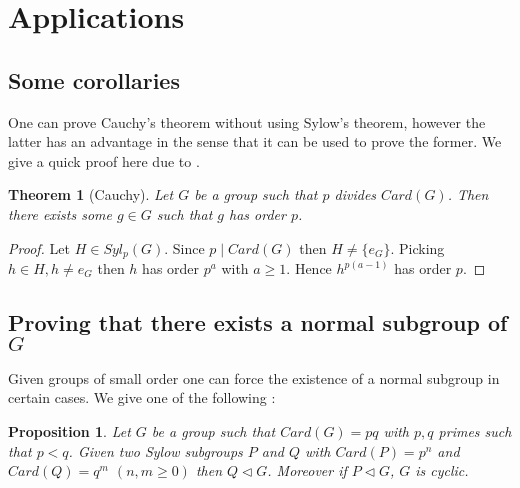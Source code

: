 \documentclass{article}
\theoremstyle{definition}
\theoremstyle{plain}
\newtheorem{proposition}[subsubsection]{Proposition}
\theoremstyle{plain}
\theoremstyle{plain}
\theoremstyle{plain}
\theoremstyle{definition}
\theoremstyle{plain}
\newtheorem{thmeng}[subsubsection]{Theorem}
\theoremstyle{plain}
\begin{document}
\clearpage
{}
\section{Applications}

\subsection{Some corollaries}

One can prove Cauchy's theorem without using Sylow's theorem, however the latter has an advantage in the sense that it can be used to prove the former. We give a quick proof here due to \cite{serre1979ens}.

\begin{thmeng}[Cauchy]
	Let \( G \) be a group such that \( p \) divides \( Card(G) \). Then there exists some \( g \in G \) such that \( g \) has order \( p \).
\end{thmeng}

\begin{proof}
	Let \( H \in Syl_p(G) \). Since \( p \mid Card(G) \) then \( H \neq \{e_G\} \). 
	Picking \( h \in H, h \neq e_G \)
	then \( h \)  has order \( p^{a} \) with \( a \geq 1 \). 
	Hence \( h^{p(a-1)} \) has order \( p \).
\end{proof}

\subsection{Proving that there exists a normal subgroup of \ensuremath{G}}

Given groups of small order one can force the existence of a normal subgroup in certain cases. We give one of the following :

\begin{proposition}\label{primes}
	Let \( G \) be a group such that \( Card(G) = pq \) with \( p,q \) primes such that \( p < q \). Given two Sylow subgroups \( P \) and \( Q \) with \( Card(P) = p^{n} \) and \( Card(Q) = q^{m} \) \( (n, m \geq 0) \) then \( Q \triangleleft G \). 
	Moreover if \( P \triangleleft G \), \( G \) is cyclic.
\end{proposition}
\end{document}
